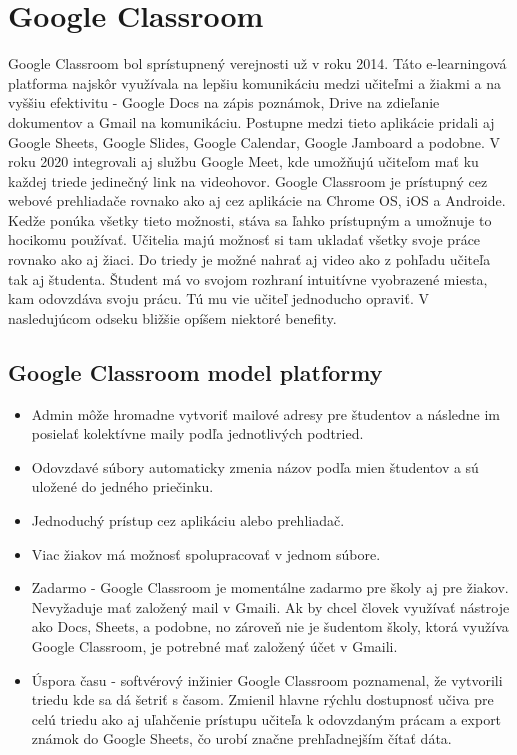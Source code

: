 \documentclass[10pt,slovak,a4paper]{article}
\begin{document}
\section{Google Classroom} \label{Google Classroom}

Google Classroom bol sprístupnený verejnosti už v roku 2014. \cite {release_date} Táto e-learningová platforma najskôr využívala na lepšiu komunikáciu medzi učiteľmi a žiakmi a na vyššiu efektivitu - Google Docs na zápis poznámok, Drive na zdieľanie dokumentov a Gmail na komunikáciu. Postupne medzi tieto aplikácie pridali aj Google Sheets, Google Slides, Google Calendar, Google Jamboard a podobne. V roku 2020 integrovali aj službu Google Meet, kde umožňujú učiteľom mať ku každej triede jedinečný link na videohovor. Google Classroom je prístupný cez webové prehliadače rovnako ako aj cez aplikácie na Chrome OS, iOS a Androide. Kedže ponúka všetky tieto možnosti, stáva sa ľahko prístupným a umožnuje to hocikomu používať. \cite {COVID-19clanok} Učitelia majú možnosť si tam ukladať všetky svoje práce rovnako ako aj žiaci. Do triedy je možné nahrať aj video ako z pohľadu učiteľa tak aj študenta. Študent má vo svojom rozhraní intuitívne vyobrazené miesta, kam odovzdáva svoju prácu. Tú mu vie učiteľ jednoducho opraviť. V nasledujúcom odseku bližšie opíšem niektoré benefity.

\subsection{Google Classroom model platformy} \label{Google Classroom: Google Classroom model platformy}

\begin{itemize}
	\item Admin môže hromadne vytvoriť mailové adresy pre študentov a následne im posielať kolektívne maily podľa jednotlivých podtried. 
	\item Odovzdavé súbory automaticky zmenia názov podľa mien študentov a sú uložené do jedného priečinku.
	\item Jednoduchý prístup cez aplikáciu alebo prehliadač.
	\item Viac žiakov má možnosť spolupracovať v jednom súbore.
	\item Zadarmo -
Google Classroom je momentálne zadarmo pre školy aj pre žiakov. Nevyžaduje mať založený mail v Gmaili. Ak by chcel človek využívať nástroje ako Docs, Sheets, a podobne, no zároveň nie je šudentom školy, ktorá využíva Google Classroom, je potrebné mať založený účet v Gmaili. 
	\item Úspora času - softvérový inžinier Google Classroom poznamenal, že vytvorili triedu kde sa dá šetriť s časom. Zmienil hlavne rýchlu dostupnosť učiva pre celú triedu ako aj uľahčenie prístupu učiteľa k odovzdaným prácam a export známok do Google Sheets, čo urobí značne prehľadnejším čítať dáta. \cite {GoogleClassroomPBL}
	\end{itemize}
\end{document}
